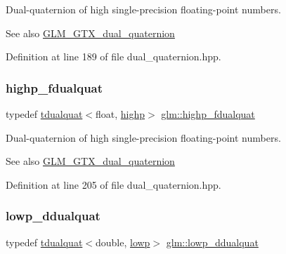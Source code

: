 Dual-\/quaternion of high single-\/precision floating-\/point numbers.

\begin{DoxySeeAlso}{See also}
\mbox{\hyperlink{group__gtx__dual__quaternion}{G\+L\+M\+\_\+\+G\+T\+X\+\_\+dual\+\_\+quaternion}} 
\end{DoxySeeAlso}


Definition at line 189 of file dual\+\_\+quaternion.\+hpp.

\mbox{\label{group__gtx__dual__quaternion_ga8c46d61c38b2b6d9c5091c667dd20fe8}} 
\subsubsection{\texorpdfstring{highp\_fdualquat}{highp\_fdualquat}}
{\footnotesize\ttfamily typedef \mbox{\hyperlink{structglm_1_1tdualquat}{tdualquat}}$<$float, \mbox{\hyperlink{namespaceglm_a0f04f086094c747d227af4425893f545ac6f7eab42eacbb10d59a58e95e362074}{highp}}$>$ \mbox{\hyperlink{group__gtx__dual__quaternion_ga8c46d61c38b2b6d9c5091c667dd20fe8}{glm\+::highp\+\_\+fdualquat}}}

Dual-\/quaternion of high single-\/precision floating-\/point numbers.

\begin{DoxySeeAlso}{See also}
\mbox{\hyperlink{group__gtx__dual__quaternion}{G\+L\+M\+\_\+\+G\+T\+X\+\_\+dual\+\_\+quaternion}} 
\end{DoxySeeAlso}


Definition at line 205 of file dual\+\_\+quaternion.\+hpp.

\mbox{\label{group__gtx__dual__quaternion_ga361a2ea6cce1446a8ab7e7803156c16c}} 
\subsubsection{\texorpdfstring{lowp\_ddualquat}{lowp\_ddualquat}}
{\footnotesize\ttfamily typedef \mbox{\hyperlink{structglm_1_1tdualquat}{tdualquat}}$<$double, \mbox{\hyperlink{namespaceglm_a0f04f086094c747d227af4425893f545ae161af3fc695e696ce3bf69f7332bc2d}{lowp}}$>$ \mbox{\hyperlink{group__gtx__dual__quaternion_ga361a2ea6cce1446a8ab7e7803156c16c}{glm\+::lowp\+\_\+ddualquat}}}

